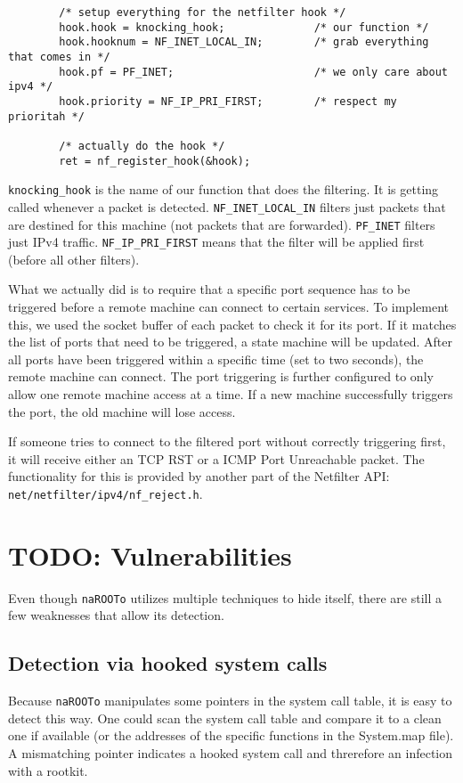 \documentclass[10pt, letterpaper]{scrartcl}
\begin{document}
\begin{verbatim}
        /* setup everything for the netfilter hook */
        hook.hook = knocking_hook;              /* our function */
        hook.hooknum = NF_INET_LOCAL_IN;        /* grab everything that comes in */
        hook.pf = PF_INET;                      /* we only care about ipv4 */
        hook.priority = NF_IP_PRI_FIRST;        /* respect my prioritah */

        /* actually do the hook */
        ret = nf_register_hook(&hook);
\end{verbatim} 

\texttt{knocking\_hook} is the name of our function that does the filtering. It is getting called whenever a packet is detected. \texttt{NF\_INET\_LOCAL\_IN} filters just packets that are destined for this machine (not packets that are forwarded). \texttt{PF\_INET} filters just IPv4 traffic. \texttt{NF\_IP\_PRI\_FIRST} means that the filter will be applied first (before all other filters).

What we actually did is to require that a specific port sequence has to be triggered before a remote machine can connect to certain services.
To implement this, we used the socket buffer of each packet to check it for its port.
If it matches the list of ports that need to be triggered, a state machine will be updated.
After all ports have been triggered within a specific time (set to two seconds), the remote machine can connect.
The port triggering is further configured to only allow one remote machine access at a time.
If a new machine successfully triggers the port, the old machine will lose access.

If someone tries to connect to the filtered port without correctly triggering first, it will receive either an TCP RST or a ICMP Port Unreachable packet.
The functionality for this is provided by another part of the Netfilter API: \texttt{net/netfilter/ipv4/nf\_reject.h}.

\section{TODO: Vulnerabilities}\label{sec:vulnerabilities}
Even though \texttt{naROOTo} utilizes multiple techniques to hide itself, there are still a few weaknesses that allow its detection.

\subsection{Detection via hooked system calls}
Because \texttt{naROOTo} manipulates some pointers in the system call table, it is easy to detect this way.
One could scan the system call table and compare it to a clean one if available (or the addresses of the specific functions in the System.map file).
A mismatching pointer indicates a hooked system call and threrefore an infection with a rootkit.
\end{document}
